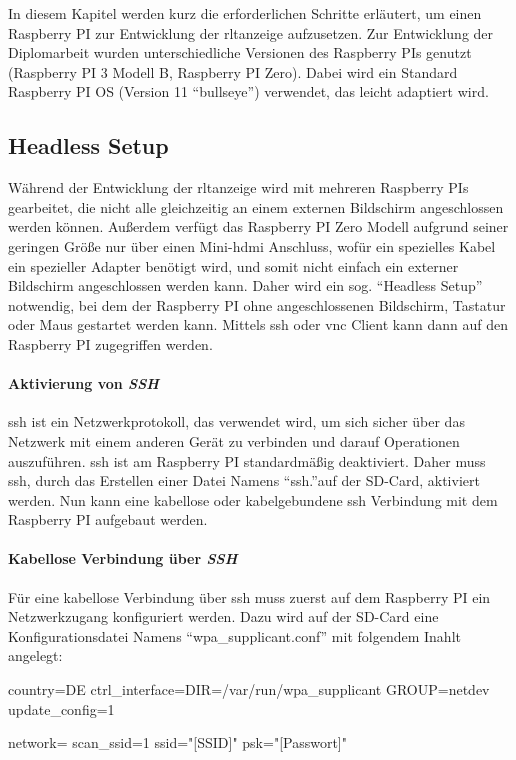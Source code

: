\label{raspi_setup}
In diesem Kapitel werden kurz die erforderlichen Schritte erläutert, um einen Raspberry PI zur Entwicklung der \ac{rltanzeige} aufzusetzen.
Zur Entwicklung der Diplomarbeit wurden unterschiedliche Versionen des Raspberry PIs genutzt (Raspberry PI 3 Modell B, Raspberry PI Zero). Dabei wird ein Standard Raspberry PI OS (Version 11 \enquote{bullseye}) verwendet, das leicht adaptiert wird.

\subsection{Headless Setup}\label{raspi_headless_setup}
Während der Entwicklung der \ac{rltanzeige} wird mit mehreren Raspberry PIs gearbeitet, die nicht alle gleichzeitig an einem externen Bildschirm angeschlossen werden können. Außerdem verfügt das Raspberry PI Zero Modell aufgrund seiner geringen Größe nur über einen Mini-\ac{hdmi} Anschluss, wofür ein spezielles Kabel \bzw ein spezieller Adapter benötigt wird, und somit nicht einfach ein externer Bildschirm angeschlossen werden kann. Daher wird ein sog. \enquote{Headless Setup} notwendig, bei dem der Raspberry PI ohne angeschlossenen Bildschirm, Tastatur oder Maus gestartet werden kann. Mittels \ac{ssh} oder \ac{vnc} Client kann dann auf den Raspberry PI zugegriffen werden.
\cite[vgl.][]{Piltch:2022}

\paragraph{Aktivierung von \textit{SSH}}
\ac{ssh} ist ein Netzwerkprotokoll, das verwendet wird, um sich sicher über das Netzwerk mit einem anderen Gerät zu verbinden und darauf Operationen auszuführen. \ac{ssh} ist am Raspberry PI standardmäßig deaktiviert.  Daher muss \ac{ssh}, durch das Erstellen einer Datei Namens \enquote{ssh.}auf der SD-Card, aktiviert werden. Nun kann eine kabellose oder kabelgebundene \ac{ssh} Verbindung mit dem Raspberry PI aufgebaut werden.

\paragraph{Kabellose Verbindung über \textit{SSH}}
Für eine kabellose Verbindung über \ac{ssh} muss zuerst auf dem Raspberry PI ein Netzwerkzugang konfiguriert werden. Dazu wird auf der SD-Card eine Konfigurationsdatei Namens \enquote{wpa\_supplicant.conf} mit folgendem Inahlt angelegt:
\begin{textcode}
country=DE
ctrl_interface=DIR=/var/run/wpa_supplicant GROUP=netdev
update_config=1

network={
    scan_ssid=1
    ssid="[SSID]"
    psk="[Passwort]"
}
\end{textcode}

